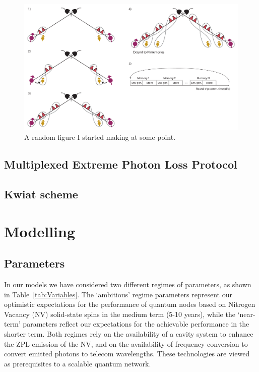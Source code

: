 \documentclass[aps,pra,superscriptaddress,preprint]{revtex4-1}
\begin{document}
\begin{figure}[htbp]
\begin{center}
\includegraphics[width=12.0cm]{MultiplexingDiagram.pdf}
\caption{A random figure I started making at some point.}
\label{fig:MultiplexingDiagram}
\end{center}
\end{figure}

\subsection{Multiplexed Extreme Photon Loss Protocol}

\subsection{Kwiat scheme}

\section{Modelling}

\subsection{Parameters}
In our models we have considered two different regimes of parameters, as shown in Table~\ref{tab:Variables}. The `ambitious' regime parameters represent our optimistic expectations for the performance of quantum nodes based on Nitrogen Vacancy (NV) solid-state spins in the medium term (5-10 years), while the `near-term' parameters reflect our expectations for the achievable performance in the shorter term. Both regimes rely on the availability of a cavity system to enhance the ZPL emission of the NV, and on the availability of frequency conversion to convert emitted photons to telecom wavelengths. These technologies are viewed as prerequisites to a scalable quantum network.  
\end{document}

